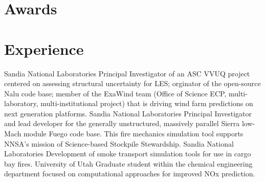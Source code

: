 \documentclass[letterpaper]{twentysecondcv_spd} %
\begin{document}
\section{Awards}

\begin{twentyshort} %
\end{twentyshort}


\section{Experience}

\begin{twenty} %
	 {Sandia National Laboratories} {Principal Investigator of an
ASC VVUQ project centered on assessing structural uncertainty for LES; orginator of the open-source 
Nalu code base; member of the ExaWind team (Office of Science ECP, multi-laboratory, multi-institutional project) that is
driving wind farm predictions on next generation platforms.}
	 {Sandia National Laboratories}  {Principal Investigator
 and lead developer for the generally unstructured, massively parallel Sierra low-Mach module Fuego code base. This fire mechanics
simulation tool supports NNSA's mission of Science-based Stockpile Stewardship.}
	 {Sandia National Laboratories} {Development of smoke transport simulation
tools for use in cargo bay fires.}
	 {University of Utah} {Graduate student within the chemical engineering department
 focused on computational approaches for improved NOx prediction.}
\end{twenty}


\newpage %
\end{document}
